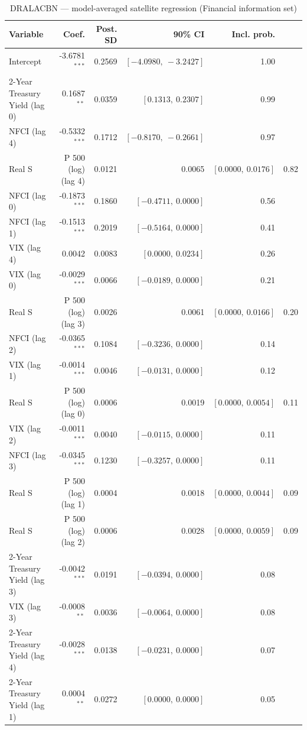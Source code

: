 \begin{table}[!htbp]
\centering
\caption{DRALACBN --- model-averaged satellite regression (Financial information set)}
\label{tab:dralacbn_financial_bma_satellite}
\begin{tabular}{lrrrr}
\toprule
Variable & Coef. & Post. SD & 90\% CI & Incl. prob. \\
\midrule
Intercept & -3.6781$^{***}$ & 0.2569 & $[-4.0980,\ -3.2427]$ & 1.00 \\
2-Year Treasury Yield (lag 0) & 0.1687$^{**}$ & 0.0359 & $[0.1313,\ 0.2307]$ & 0.99 \\
NFCI (lag 4) & -0.5332$^{***}$ & 0.1712 & $[-0.8170,\ -0.2661]$ & 0.97 \\
Real S&P 500 (log) (lag 4) & 0.0121 & 0.0065 & $[0.0000,\ 0.0176]$ & 0.82 \\
NFCI (lag 0) & -0.1873$^{***}$ & 0.1860 & $[-0.4711,\ 0.0000]$ & 0.56 \\
NFCI (lag 1) & -0.1513$^{***}$ & 0.2019 & $[-0.5164,\ 0.0000]$ & 0.41 \\
VIX (lag 4) & 0.0042 & 0.0083 & $[0.0000,\ 0.0234]$ & 0.26 \\
VIX (lag 0) & -0.0029$^{***}$ & 0.0066 & $[-0.0189,\ 0.0000]$ & 0.21 \\
Real S&P 500 (log) (lag 3) & 0.0026 & 0.0061 & $[0.0000,\ 0.0166]$ & 0.20 \\
NFCI (lag 2) & -0.0365$^{***}$ & 0.1084 & $[-0.3236,\ 0.0000]$ & 0.14 \\
VIX (lag 1) & -0.0014$^{***}$ & 0.0046 & $[-0.0131,\ 0.0000]$ & 0.12 \\
Real S&P 500 (log) (lag 0) & 0.0006 & 0.0019 & $[0.0000,\ 0.0054]$ & 0.11 \\
VIX (lag 2) & -0.0011$^{***}$ & 0.0040 & $[-0.0115,\ 0.0000]$ & 0.11 \\
NFCI (lag 3) & -0.0345$^{***}$ & 0.1230 & $[-0.3257,\ 0.0000]$ & 0.11 \\
Real S&P 500 (log) (lag 1) & 0.0004 & 0.0018 & $[0.0000,\ 0.0044]$ & 0.09 \\
Real S&P 500 (log) (lag 2) & 0.0006 & 0.0028 & $[0.0000,\ 0.0059]$ & 0.09 \\
2-Year Treasury Yield (lag 3) & -0.0042$^{***}$ & 0.0191 & $[-0.0394,\ 0.0000]$ & 0.08 \\
VIX (lag 3) & -0.0008$^{**}$ & 0.0036 & $[-0.0064,\ 0.0000]$ & 0.08 \\
2-Year Treasury Yield (lag 4) & -0.0028$^{***}$ & 0.0138 & $[-0.0231,\ 0.0000]$ & 0.07 \\
2-Year Treasury Yield (lag 1) & 0.0004$^{**}$ & 0.0272 & $[0.0000,\ 0.0000]$ & 0.05 \\

\end{tabular}
\end{table}
